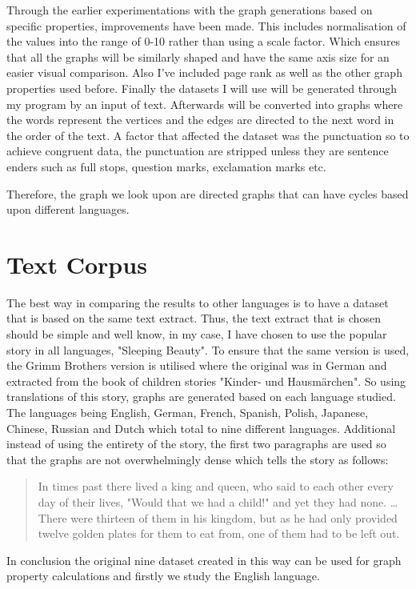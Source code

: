 Through the earlier experimentations with the graph generations based on specific properties, improvements have been made. This includes normalisation of the values into the range of 0-10 rather than using a scale factor. Which ensures that all the graphs will be similarly shaped and have the same axis size for an easier visual comparison. Also I've included page rank as well as the other graph properties used before. Finally the datasets I will use will be generated through my program by an input of text. Afterwards will be converted into graphs where the words represent the vertices and the edges are directed to the next word in the order of the text. A factor that affected the dataset was the punctuation so to achieve congruent data, the punctuation are stripped unless they are sentence enders such as full stops, question marks, exclamation marks etc. 

Therefore, the graph we look upon are directed graphs that can have cycles based upon different languages.

\section{Text Corpus}
The best way in comparing the results to other languages is to have a dataset that is based on the same text extract. Thus, the text extract that is chosen should be simple and well know, in my case, I have chosen to use the popular story in all languages, "Sleeping Beauty". To ensure that the same version is used, the Grimm Brothers version is utilised where the original was in German and extracted from the book of children stories "Kinder- und Hausmärchen"\cite{grimm1857kinder}. So using translations of this story, graphs are generated based on each language studied. The languages being English, German, French, Spanish, Polish, Japanese, Chinese, Russian and Dutch which total to nine different languages. Additional instead of using the entirety of the story, the first two paragraphs are used so that the graphs are not overwhelmingly dense which tells the story as follows:
\begin{quote}
In times past there lived a king and queen, who said to each other every day of their lives, "Would that we had a child!" and yet they had none. \dots There were thirteen of them in his kingdom, but as he had only provided twelve golden plates for them to eat from, one of them had to be left out.
\end{quote}
In conclusion the original nine dataset created in this way can be used for graph property calculations and firstly we study the English language.

